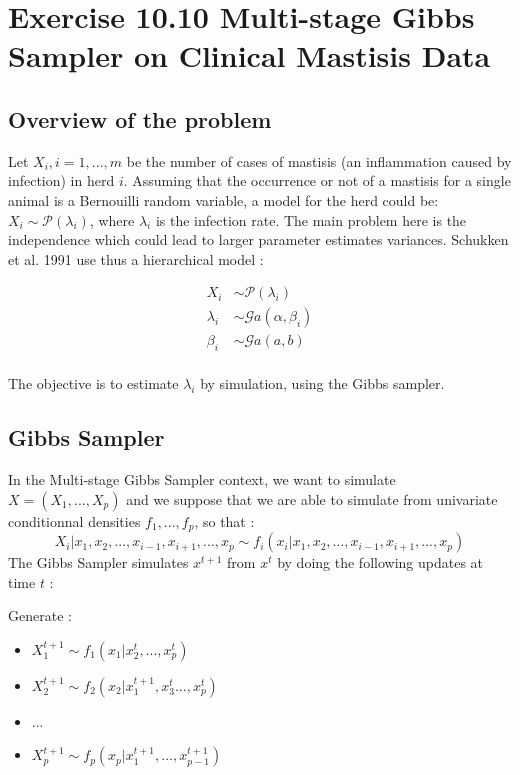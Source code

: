 \documentclass{article}
\begin{document}
\section*{Exercise 10.10 Multi-stage Gibbs Sampler on Clinical Mastisis Data}

\subsection*{Overview of the problem}

Let $X_i, i=1, ..., m$ be the number of cases of mastisis (an inflammation 
caused by infection) in herd $i$. Assuming that the occurrence or not of a
 mastisis for a single animal is a Bernouilli random variable, a model for
  the herd could be:   $X_i \sim \mathcal{P}(\lambda_i)$,
where $\lambda_i$ is the infection rate. The main problem here is the
 independence which could lead to larger parameter estimates variances. 
 Schukken et al. 1991 use thus a hierarchical model :

\begin{align*}
    X_i &\sim \mathcal{P}(\lambda_i) \\
\lambda_i &\sim \mathcal{G}a(\alpha, \beta_i)  \\
\beta_i  &\sim \mathcal{G}a(a, b) \\
\end{align*}

\noindent The objective is to estimate $\lambda_i$ by simulation,
 using the Gibbs sampler.

\subsection*{Gibbs Sampler}

In the Multi-stage Gibbs Sampler context, we want to simulate
 $X = (X_1, ..., X_p)$ and we suppose that we are able to simulate
  from univariate conditionnal densities $f_1, ..., f_p$, so that :
$$X_i | x_1, x_2, ..., x_{i-1},x_{i+1}, ...,x_p \sim f_i(x_i | x_1, x_2, ..., x_{i-1},x_{i+1}, ...,x_p )$$
The Gibbs Sampler simulates $x^{t+1}$ from $x^{t}$ by doing the
 following updates at time $t$ : 

Generate : 
\begin{itemize}
    \item $X_1^{t+1} \sim f_1(x_1 | x_2^t, ..., x_p^t) $
    \item $X_2^{t+1} \sim f_2(x_2 | x_1^{t+1},x_3^t ..., x_p^t) $
    \item ...
    \item $X_p^{t+1} \sim f_p(x_p | x_1^{t+1}, ..., x_{p-1}^{t+1}) $
\end{itemize}
\end{document}
